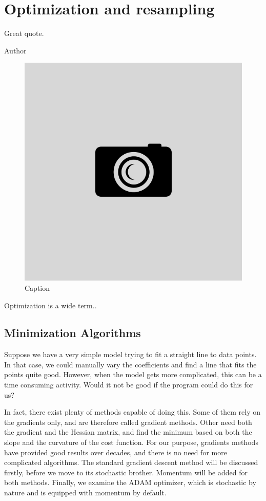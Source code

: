 \chapter{Optimization and resampling} \label{chp:optimization}
\epigraph{Great quote.}{Author}
\begin{figure}[H]
	\centering
	\includegraphics[scale=0.4]{Images/example.png}
	\caption{Caption}
\end{figure}

Optimization is a wide term..

\newpage
\section{Minimization Algorithms}
Suppose we have a very simple model trying to fit a straight line to data points. In that case, we could manually vary the coefficients and find a line that fits the points quite good. However, when the model gets more complicated, this can be a time consuming activity. Would it not be good if the program could do this for us?

In fact, there exist plenty of methods capable of doing this. Some of them rely on the gradients only, and are therefore called gradient methods. Other need both the gradient and the Hessian matrix, and find the minimum based on both the slope and the curvature of the cost function. For our purpose, gradients methods have provided good results over decades, and there is no need for more complicated algorithms. The standard gradient descent method will be discussed firstly, before we move to its stochastic brother. Momentum will be added for both methods. Finally, we examine the ADAM optimizer, which is stochastic by nature and is equipped with momentum by default. 

